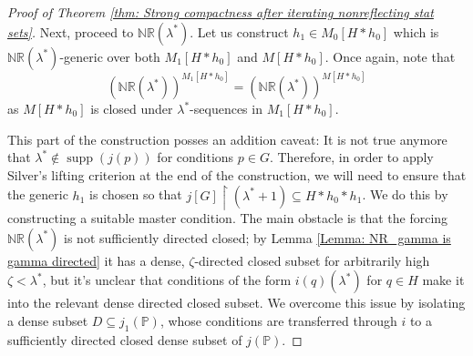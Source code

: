 \documentclass[11pt]{amsart}
\renewcommand{\restriction}{\mathbin\upharpoonright}    %
\theoremstyle{definition}
\newcounter{condition}
\theoremstyle{remark}
\newcommand\<{{<}}
\DeclareMathOperator{\supp}{supp}
\def\s{\subseteq}
\newcommand{\po}{\mathbb{P}}
\begin{document}
\begin{proof}[Proof of Theorem \ref{thm: Strong compactness after iterating nonreflecting stat sets}]
\smallskip

Next, proceed to $\mathbb{NR}(\lambda^*)$. Let us construct $h_1\in M_0[H\ast h_0]$ which is $\mathbb{NR}(\lambda^*)$-generic over both $M_{1}[H*h_0]$ and $M[H*h_0]$. Once again, note that 
$$(\mathbb{NR}(\lambda^*))^{M_1[H*h_0]}= (\mathbb{NR}(\lambda^*))^{M[H*h_0]}$$
as $M[H*h_0]$ is closed under $\lambda^*$-sequences in $M_1[H*h_0]$.

This part of the construction posses an addition caveat: It is not true anymore that $\lambda^*\notin \supp(j(p))$ for conditions $p\in G$. Therefore, in order to apply Silver's lifting criterion at the end of the construction, we will need to ensure that the generic $h_1$ is chosen so that  $j[G]\restriction (\lambda^*+1)\s H*h_0*h_1$. We do this by constructing a suitable master condition. The main obstacle is that the forcing $\mathbb{NR}(\lambda^*)$ is not sufficiently directed closed; by Lemma \ref{Lemma: NR_gamma is gamma directed} it has a dense, $\zeta$-directed closed subset for arbitrarily high $\zeta<\lambda^*$, but it's unclear that conditions of the form $i(q)(\lambda^*)$ for $q\in H$ make it into the relevant dense directed closed subset. We overcome this issue by isolating a dense subset $D\subseteq j_1(\po)$, whose conditions are transferred through $i$ to a sufficiently directed closed dense subset of $j(\po)$.   


\end{proof}
\end{document}
